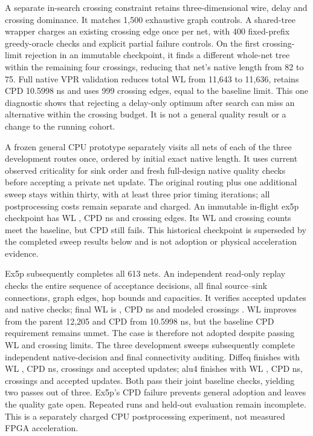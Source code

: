 \documentclass[10pt]{article}
\begin{document}
A separate in-search crossing constraint retains three-dimensional
wire, delay and crossing dominance. It matches 1,500 exhaustive graph
controls. A shared-tree wrapper charges an existing crossing edge once
per net, with 400 fixed-prefix greedy-oracle checks and explicit partial
failure controls. On the first crossing-limit rejection in an immutable
checkpoint, it finds a different whole-net tree within the remaining four
crossings, reducing that net's native length from 82 to 75. Full native
VPR validation reduces total WL from 11,643 to 11,636, retains CPD
10.5998 ns and uses 999 crossing edges, equal to the baseline limit.
This one diagnostic shows that rejecting a delay-only optimum after
search can miss an alternative within the crossing budget. It is not a
general quality result or a change to the running cohort.

A frozen general CPU prototype separately visits all nets of each of
the three development routes once, ordered by initial exact native
length. It uses current observed criticality for sink order and fresh
full-design native quality checks before accepting a private net update.
The original routing plus one additional sweep stays within thirty,
with at least three prior timing iterations; all postprocessing costs
remain separate and charged. An immutable in-flight ex5p checkpoint
has WL \SlackCheckpointWL{}, CPD \SlackCheckpointCPD{} ns and \SlackCheckpointCrossings{} crossing
edges. Its WL and crossing counts meet the baseline, but CPD still
fails. This historical checkpoint is superseded by the completed sweep
results below and is not adoption or physical acceleration evidence.

Ex5p subsequently completes all 613 nets. An independent read-only
replay checks the entire sequence of acceptance decisions, all final
source--sink connections, graph edges, hop bounds and capacities.
It verifies \SlackExFinalAccepted{} accepted updates and \SlackExNativeCalls{} native checks;
final WL is \SlackExFinalWL{}, CPD \SlackExFinalCPD{} ns and modeled crossings \SlackExFinalCrossings{}.
WL improves from the parent 12,205 and CPD from 10.5998 ns, but the
baseline CPD requirement remains unmet. The case is therefore not
adopted despite passing WL and crossing limits. The three development
sweeps subsequently complete independent native-decision and final
connectivity auditing. Diffeq finishes with WL \SlackDiffeqWL{},
CPD \SlackDiffeqCPD{} ns, \SlackDiffeqCrossings{} crossings and
\SlackDiffeqAccepted{} accepted updates; alu4 finishes with WL
\SlackAluWL{}, CPD \SlackAluCPD{} ns, \SlackAluCrossings{} crossings
and \SlackAluAccepted{} accepted updates. Both pass their joint baseline
checks, yielding two passes out of three. Ex5p's CPD failure prevents
general adoption and leaves the quality gate open. Repeated runs and
held-out evaluation remain incomplete. This is a separately charged CPU
postprocessing experiment, not measured FPGA acceleration.
\end{document}
